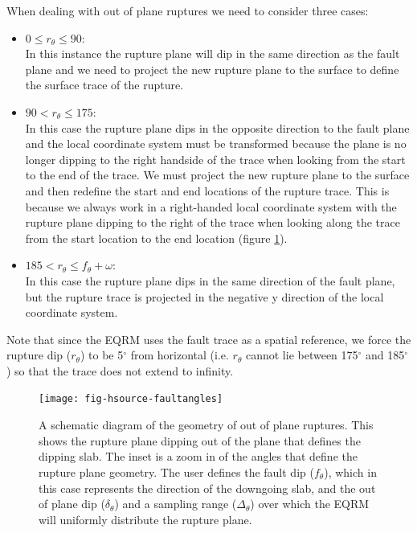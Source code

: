 When dealing with out of plane ruptures we need to consider three cases:
\begin{itemize} 
\item $0 \leq r_\theta \leq 90:$ \\ In this instance the rupture plane will dip in the same direction as the fault plane and we need to project the new rupture plane to 
the surface to define the surface trace of the rupture.
\item $90 <  r_\theta \leq 175:$ \\ In this case the rupture plane dips in the opposite direction to the fault plane and the local coordinate system must be transformed 
because the plane is no longer dipping to the right handside of the trace when looking from the start to the end of the trace. We must project the new rupture plane to 
the surface and then redefine the start and end locations of the rupture trace. This is because we always work in a right-handed local coordinate system with the rupture 
plane dipping to the right of the trace when looking along the trace from the start location to the end location (figure \ref{fig:intraslabGeom}).  
\item $185 < r_\theta \leq f_\theta + \omega :$ \\ In this case the rupture plane dips in the same direction of the fault plane, but the rupture trace is projected in 
the negative y direction of the local coordinate system. 
\end{itemize}

Note that since the EQRM uses the fault trace as a spatial reference, we force the rupture dip ($r_\theta$) to be 5$^\circ$ from horizontal (i.e. $r_\theta$ cannot lie 
between 175$^\circ$ and 185$^\circ$) so that the trace does not extend to infinity.

\begin{figure}[htp]
\centerline{\texttt{[image: fig-hsource-faultangles]}}
\caption{A schematic diagram of the geometry of out of plane ruptures. This shows the rupture plane dipping out of the plane that defines the dipping slab. 
The inset is a zoom in of the angles that define the rupture plane geometry. The user defines the fault dip ($f_\theta$), which in this case represents the direction 
of the downgoing slab, and the out of plane dip ($\delta_\theta$) and a sampling range ($\Delta_\theta$) over which the EQRM will uniformly distribute the rupture plane. }
\label{fig:intraslabGeom}
\end{figure}

